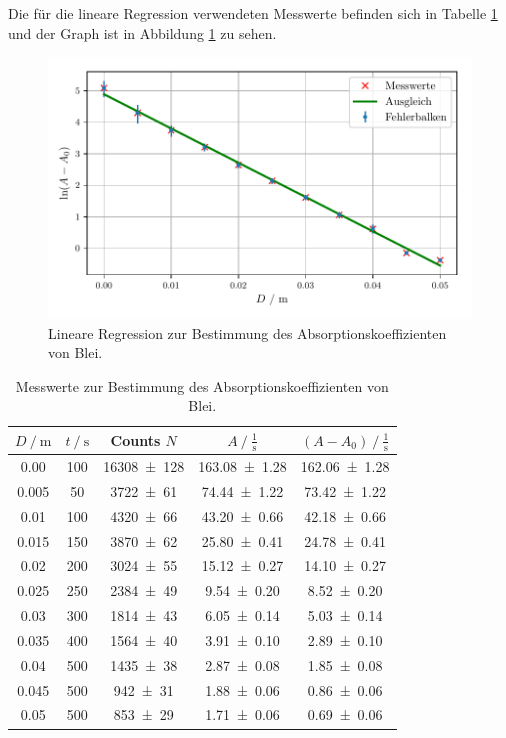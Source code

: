 Die für die lineare Regression verwendeten Messwerte befinden sich in Tabelle \ref{tab:blei} und der Graph ist in Abbildung \ref{fig:blei} zu sehen.
\begin{figure}[H]
  \center
  \includegraphics[scale = 0.75]{blei.pdf}
  \caption{Lineare Regression zur Bestimmung des Absorptionskoeffizienten von Blei.}
  \label{fig:blei}
\end{figure}
\begin{table}[H]
  \centering
  \caption{Messwerte zur Bestimmung des Absorptionskoeffizienten von Blei.}
  \label{tab:blei}
  \begin{tabular}{c c c c c}
    \toprule
$D\:/\:\si{\meter}$ & $t\:/\:\si{\second}$ & Counts $N$ & $A\:/\:\frac{1}{\si{\second}}$ & $(A-A_0)\:/\:\frac{1}{\si{\second}}$ \\
    \midrule
    0.00  & 100 & \num{16308 +- 128} & \num{163.08 +- 1.28}   & \num{162.06 +- 1.28} \\
    0.005 & 50  & \num{3722 +- 61}   & \num{74.44 +- 1.22}    & \num{73.42 +- 1.22}  \\
    0.01  & 100 & \num{4320 +- 66}   & \num{43.20 +- 0.66}    & \num{42.18 +- 0.66}  \\
    0.015 & 150 & \num{3870 +- 62}   & \num{25.80 +- 0.41}    & \num{24.78  +- 0.41} \\
    0.02  & 200 & \num{3024 +- 55}   & \num{15.12 +- 0.27}    & \num{14.10  +- 0.27} \\
    0.025 & 250 & \num{2384 +- 49}   & \num{9.54 +- 0.20}     & \num{8.52 +- 0.20}  \\
    0.03  & 300 & \num{1814 +- 43}   & \num{6.05 +- 0.14}     & \num{5.03 +- 0.14}  \\
    0.035 & 400 & \num{1564 +- 40}   & \num{3.91 +- 0.10}     & \num{2.89 +- 0.10}  \\
    0.04  & 500 & \num{1435 +- 38}   & \num{2.87 +- 0.08}     & \num{1.85 +- 0.08}  \\
    0.045 & 500 & \num{942 +- 31}    & \num{1.88 +- 0.06}     & \num{0.86 +- 0.06}  \\
    0.05  & 500 & \num{853 +- 29}    & \num{1.71 +- 0.06}     & \num{0.69 +- 0.06}  \\
    \bottomrule
  \end{tabular}
\end{table}

